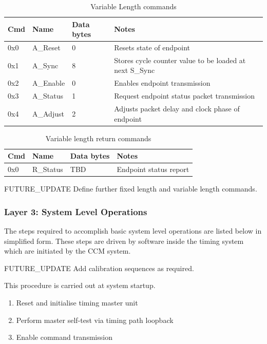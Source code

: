 \documentclass{dune}
\begin{document}
\begin{table}[h!]
  \centering
  \begin{tabular}{@{}lllp{9cm}@{}} \toprule
    Cmd & Name & Data bytes & Notes\\ \midrule
    0x0 & A\_Reset & 0 & Resets state of endpoint \\
    0x1 & A\_Sync & 8 & Stores cycle counter value to be loaded at next S\_Sync \\
    0x2 & A\_Enable & 0 & Enables endpoint transmission \\
    0x3 & A\_Status & 1 & Request endpoint status packet transmission \\ 
    0x4 & A\_Adjust & 2 & Adjusts packet delay and clock phase of endpoint \\ \bottomrule
  \end{tabular}
  \caption{Variable Length commands}
  \label{tab:async_cmds}
\end{table}

\begin{table}[h!]
  \centering
  \begin{tabular}{@{}lllp{9cm}@{}} \toprule
    Cmd & Name & Data bytes & Notes\\ \midrule
    0x0 & R\_Status & TBD & Endpoint status report \\ \bottomrule
  \end{tabular}
  \caption{Variable length return commands}
  \label{tab:async_ret_cmds}
\end{table}

{\color{red}FUTURE\_UPDATE} Define further fixed length and variable length commands.



\subsubsection{Layer 3: System Level Operations}

The steps required to accomplish basic system level operations are listed below in simplified form. These steps are driven by software inside the timing system which are initiated by the CCM system.

{\color{red}FUTURE\_UPDATE} Add calibration sequences as required.


This procedure is carried out at system startup.

\begin{enumerate}
	\item Reset and initialise timing master unit
	\item Perform master self-test via timing path loopback
	\item Enable command transmission
\end{enumerate}
\end{document}
